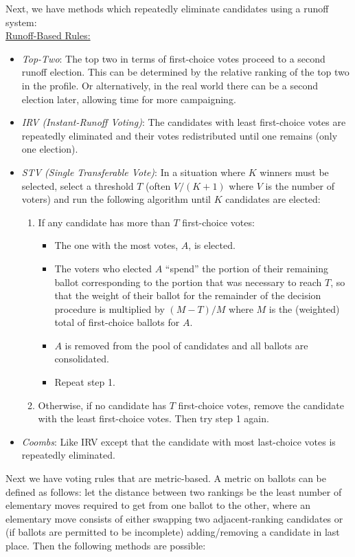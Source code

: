 \documentclass{amsart}
\begin{document}
Next, we have methods which repeatedly eliminate candidates using a runoff system:\\

\noindent \underline{Runoff-Based Rules:}
\begin{itemize}
		\item \textit{Top-Two}: The top two in terms of first-choice votes proceed to a second runoff election. This can be determined by the relative ranking of the top two in the profile. Or alternatively, in the real world there can be a second election later, allowing time for more campaigning.
	\item \textit{IRV (Instant-Runoff Voting)}: The candidates with least first-choice votes are repeatedly eliminated and their votes redistributed until one remains (only one election).
	\item \textit{STV (Single Transferable Vote)}: In a situation where $K$ winners must be selected, select a threshold $T$ (often $V/(K+1)$ where $V$ is the number of voters) and run the following algorithm until $K$ candidates are elected:
	\begin{enumerate}[(1)]
		\item If any candidate has more than $T$ first-choice votes:
		\begin{itemize}
			\item The one with the most votes, $A$, is elected.
			\item The voters who elected $A$ ``spend'' the portion of their remaining ballot corresponding to the portion that was necessary to reach $T$, so that the weight of their ballot for the remainder of the decision procedure is multiplied by $(M-T)/M$ where $M$ is the (weighted) total of first-choice ballots for $A$.
			\item $A$ is removed from the pool of candidates and all ballots are consolidated.
			\item Repeat step 1.
		\end{itemize}
		\item Otherwise, if no candidate has $T$ first-choice votes, remove the candidate with the least first-choice votes. Then try step 1 again.
	\end{enumerate}
	\item \textit{Coombs}: Like IRV except that the candidate with most last-choice votes is repeatedly eliminated.\\
\end{itemize}

Next we have voting rules that are metric-based. A metric on ballots can be defined as follows: let the distance between two rankings be the least number of elementary moves required to get from one ballot to the other, where an elementary move consists of either swapping two adjacent-ranking candidates or (if ballots are permitted to be incomplete) adding/removing a candidate in last place. Then the following methods are possible:\\
\end{document}
